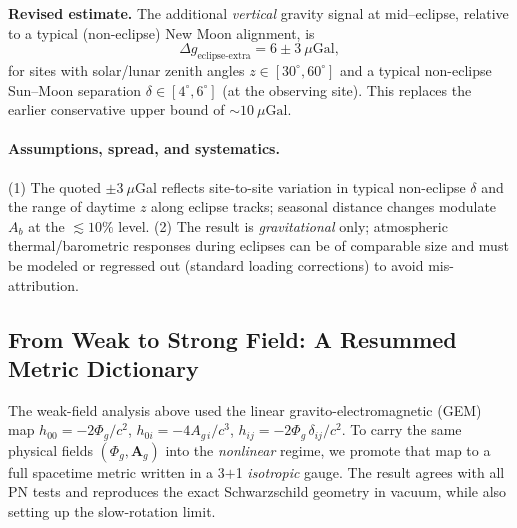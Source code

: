 \begin{keyresult}
\textbf{Revised estimate.} The additional \emph{vertical} gravity signal at mid–eclipse,
relative to a typical (non-eclipse) New Moon alignment, is
\[
\Delta g_{\text{eclipse-extra}} = 6 \pm 3~\mu\mathrm{Gal},
\]
for sites with solar/lunar zenith angles $z \in [30^\circ,60^\circ]$ and a typical
non-eclipse Sun–Moon separation $\delta \in [4^\circ,6^\circ]$ (at the observing site).
This replaces the earlier conservative upper bound of $\sim\!10~\mu\mathrm{Gal}$.
\end{keyresult}

\paragraph{Assumptions, spread, and systematics.}
(1) The quoted $\pm 3~\mu$Gal reflects site-to-site variation in typical non-eclipse
$\delta$ and the range of daytime $z$ along eclipse tracks; seasonal distance changes
modulate $A_b$ at the $\lesssim 10\%$ level.
(2) The result is \emph{gravitational} only; atmospheric thermal/barometric responses
during eclipses can be of comparable size and must be modeled or regressed out
(standard loading corrections) to avoid mis-attribution.

\subsection{From Weak to Strong Field: A Resummed Metric Dictionary}
\label{sec:strong-dict}

The weak-field analysis above used the linear gravito-electromagnetic (GEM) map
\(h_{00}=-2\Phi_g/c^2\), \(h_{0i}=-4A_{g\,i}/c^3\), \(h_{ij}=-2\Phi_g\,\delta_{ij}/c^2\).
To carry the same physical fields \((\Phi_g,\mathbf A_g)\) into the \emph{nonlinear} regime, we promote that map to a full spacetime metric written in a 3\(+\)1 \emph{isotropic} gauge. The result agrees with all PN tests and reproduces the exact Schwarzschild geometry in vacuum, while also setting up the slow-rotation limit.

